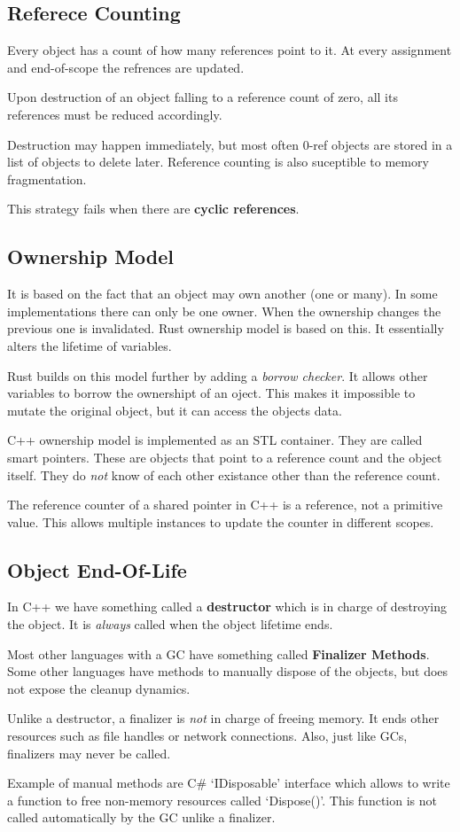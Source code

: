 \subsection*{Referece Counting}
Every object has a count of how many references point to it. At every
assignment and end-of-scope the refrences are updated.

Upon destruction of an object falling to a reference count of zero, all
its references must be reduced accordingly.

Destruction may happen immediately, but most often 0-ref objects are
stored in a list of objects to delete later. Reference counting is also
suceptible to memory fragmentation.

This strategy fails when there are \textbf{cyclic references}.

\subsection*{Ownership Model}
It is based on the fact that an object may own another (one or many). In
some implementations there can only be one owner. When the ownership
changes the previous one is invalidated. Rust ownership model is based
on this. It essentially alters the lifetime of variables.

Rust builds on this model further by adding a \textit{borrow checker}.
It allows other variables to borrow the ownershipt of an oject. This
makes it impossible to mutate the original object, but it can access the
objects data.

C++ ownership model is implemented as an STL container. They are called
smart pointers. These are objects that point to a reference count and
the object itself. They do \textit{not} know of each other existance
other than the reference count.

The reference counter of a shared pointer in C++ is a reference, not a
primitive value. This allows multiple instances to update the counter in
different scopes.

\subsection*{Object End-Of-Life}
In C++ we have something called a \textbf{destructor} which is in charge
of destroying the object. It is \textit{always} called when the object
lifetime ends.

Most other languages with a GC have something called \textbf{Finalizer
Methods}. Some other languages have methods to manually dispose of the
objects, but does not expose the cleanup dynamics.

Unlike a destructor, a finalizer is \textit{not} in charge of freeing
memory. It ends other resources such as file handles or network
connections. Also, just like GCs, finalizers may never be called.

Example of manual methods are C\# `IDisposable' interface which allows to
write a function to free non-memory resources called `Dispose()'. This
function is not called automatically by the GC unlike a finalizer.